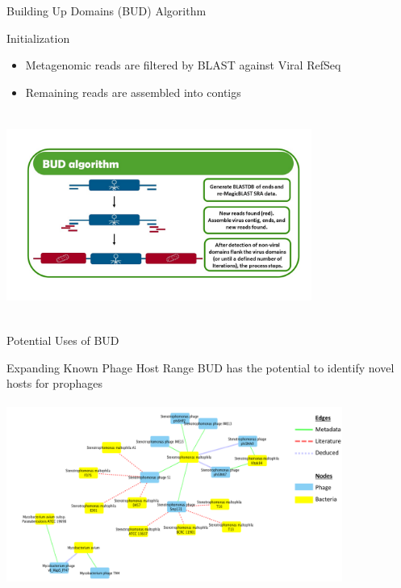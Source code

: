 \documentclass[11pt]{beamer}
\begin{document}
	
	\begin{frame}{Building Up Domains (BUD) Algorithm}
	\begin{block}{Initialization}
	\begin{itemize}
	\item Metagenomic reads are filtered by BLAST against Viral RefSeq
	\item Remaining reads are assembled into contigs
	\end{itemize}
	\end{block}
	\vspace{-0.5cm}
	\center
	\includegraphics[height=6.75cm, width=10cm]{BUD_Algorithm.jpg}
	
	\end{frame}
	
	\begin{frame}{Potential Uses of BUD	}

	\begin{block}{Expanding Known Phage Host Range}
	BUD has the potential to identify novel hosts for prophages
	
	\includegraphics[height=6cm, width=11cm]{network.png}
	\end{block}
	
	\end{frame}
	
\end{document}
